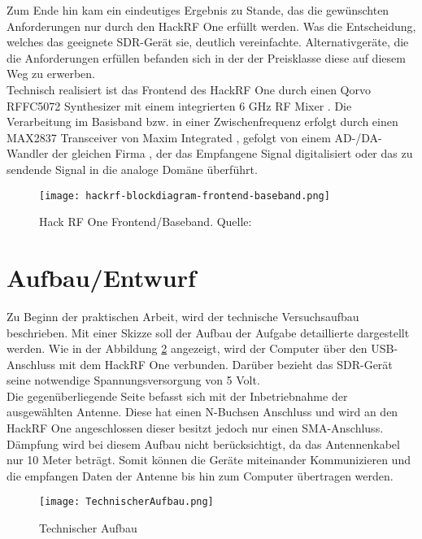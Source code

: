 Zum Ende hin kam ein eindeutiges Ergebnis zu Stande, das die gewünschten Anforderungen nur durch den HackRF One erfüllt werden. Was die Entscheidung, welches das geeignete SDR-Gerät sie, deutlich vereinfachte. Alternativgeräte, die die Anforderungen erfüllen befanden sich in der der Preisklasse diese auf diesem Weg zu erwerben.\\

Technisch realisiert ist das Frontend des HackRF One durch einen Qorvo RFFC5072 Synthesizer mit einem integrierten 6 GHz RF Mixer \cite{qorvo}.
Die Verarbeitung im Basisband bzw. in einer Zwischenfrequenz erfolgt durch einen MAX2837 Transceiver von Maxim Integrated \cite{max2837}, gefolgt von einem AD-/DA- Wandler der gleichen Firma \cite{max5864}, der das Empfangene Signal digitalisiert oder das zu sendende Signal in die analoge Domäne überführt.
\begin{figure}[H]
	\centering
	\texttt{[image: hackrf-blockdiagram-frontend-baseband.png]}
	\caption[Hack RF One Frontend/Baseband]{Hack RF One Frontend/Baseband. Quelle: \cite{hackrf-wiki:2016}} 
	\label{HackRFOne-Blockschaltbild}
\end{figure}

\newpage
\section{Aufbau/Entwurf}
Zu Beginn der praktischen Arbeit, wird der technische Versuchsaufbau beschrieben. Mit einer Skizze soll der Aufbau der Aufgabe detaillierte dargestellt werden. Wie in der Abbildung \ref{Technischer Aufbau} angezeigt, wird der Computer über den \ac{USB}-Anschluss mit dem HackRF One verbunden. Darüber bezieht das SDR-Gerät seine notwendige Spannungsversorgung von 5 Volt.\\
Die gegenüberliegende Seite befasst sich mit der Inbetriebnahme der ausgewählten Antenne. Diese hat einen N-Buchsen Anschluss und wird an den HackRF One angeschlossen dieser besitzt jedoch nur einen SMA-Anschluss. Dämpfung wird bei diesem Aufbau nicht berücksichtigt, da das Antennenkabel nur 10 Meter beträgt. Somit können die Geräte miteinander Kommunizieren und die empfangen Daten der Antenne bis hin zum Computer übertragen werden.  
\begin{figure}[H]
	\centering
	\texttt{[image: TechnischerAufbau.png]}
	\caption[Technischer Aufbau]{Technischer Aufbau} 
	\label{Technischer Aufbau}
\end{figure}

